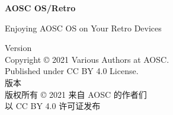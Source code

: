 \documentclass[a4paper,11pt]{article}
\begin{document}
{{\begin{minipage}[t][180mm][t]{130mm}
                \vfill

                {

                    
                    \bfseries
                    \LARGE
                    AOSC OS/Retro

                    \vspace{5pt}
                    {
                        \rmfamily
                        \normalsize\mdseries
                        Enjoying AOSC OS on Your Retro Devices
                    }
                }

                
            \end{minipage}
        }%
    }


        \hspace{1pt}
        \vfill

        \small\sffamily\mdseries
        \baselineskip=16pt

        {Version}{ }{\docversion}\\
        Copyright {\copyright} 2021 Various Authors at AOSC.\\
        Published under CC BY 4.0 License.\\
        {版本}{ }{\docversion}\\
        版权所有 {\copyright} 2021 来自 AOSC 的作者们\\
        以{ }CC BY 4.0{ }许可证发布

        
\end{document}
